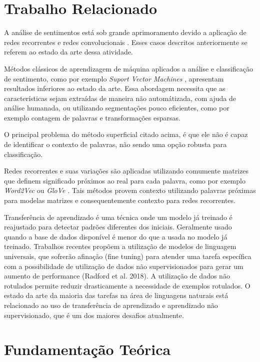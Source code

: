 \documentclass[12pt]{article}
\begin{document}
\section{Trabalho Relacionado} \label{sec:relacionado}

A análise de sentimentos está sob grande aprimoramento devido a aplicação de redes recorrentes \cite{karpathy:2015} e redes convolucionais \cite{lecun:98}. Esses casos descritos anteriormente se referem ao estado da arte dessa atividade.

Métodos clássicos de aprendizagem de máquina aplicados a análise e classificação de sentimento, como por exemplo \textit{Suport Vector Machines} \cite{DBLP:journals/ml/CortesV95}, apresentam resultados inferiores ao estado da arte. Essa abordagem necessita que as características sejam extraídas de maneira não automátizada, com ajuda de análise humanada, ou utilizando segmentações pouco eficientes, como por exemplo contagem de palavras e transformações esparsas.

O principal problema do método superficial citado acima, é que ele não é capaz de identificar o contexto de palavras, não sendo uma opção robusta para classificação.

Redes recorrentes e suas variações são aplicadas utilizando comumente matrizes que definem significado próximos ao real para cada palavra, como por exemplo \textit{Word2Vec} \cite{DBLP:journals/corr/abs-1301-3781} ou \textit{GloVe} \cite{pennington2014glove}. Tais métodos provem contexto utilizando palavras próximas para modelas matrizes e consequentemente contexto para redes recorrentes.

Transferência de aprendizado é uma técnica onde um modelo já treinado é reajustado para detectar padrões diferentes dos iniciais. Geralmente usado quando a base de dados disponível é menor do que a usada no modelo já treinado. Trabalhos recentes propõem a utilização de modelos de linguagem universais, que sofrerão afinação (fine tuning) para atender uma tarefa específica \cite{DBLP:journals/corr/abs-1801-06146} com a possibilidade de utilização de dados não supervisionados para gerar um aumento de performance (Radford et al. 2018). A utilização de dados não rotulados permite reduzir drasticamente a necessidade de exemplos rotulados. O estado da arte da maioria das tarefas na área de linguagens naturais está relacionado ao uso de transferência de aprendizado e aprendizado não supervisionado, que é um dos maiores desafios atualmente.

\section{Fundamentação Teórica} \label{sec:revisao}
\end{document}
